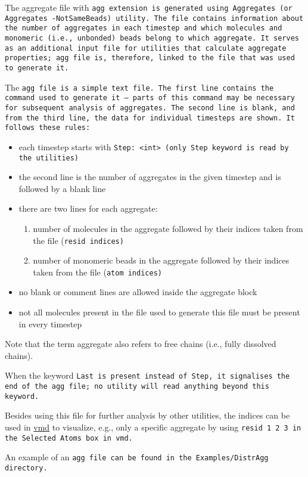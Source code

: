 The aggregate file with \tt{agg} extension is generated using
\tt{Aggregates} (or \tt{Aggregates -NotSameBeads}) utility. The
file contains information about the number of aggregates in each timestep
and which molecules and monomeric (i.e., unbonded) beads belong to which
aggregate. It serves as an additional input file for utilities that
calculate aggregate properties; \tt{agg} file is, therefore, linked to
the \vcf file that was used to generate it.

The \tt{agg} file is a simple text file. The first line contains the
command used to generate it -- parts of this command may be necessary for
subsequent analysis of aggregates. The second line is blank, and from the
third line, the data for individual timesteps are shown. It follows these
rules:

\begin{itemize}[topsep=0pt,itemsep=0pt]
  \item each timestep starts with \tt{Step: <int>} (only \tt{Step}
    keyword is read by the utilities)
  \item the second line is the number of aggregates in the given
    timestep and is followed by a blank line
  \item there are two lines for each aggregate:
  \begin{enumerate}[topsep=0pt,itemsep=0pt]
    \item number of molecules in the aggregate followed by their indices
      taken from the \vsf file (\tt{resid} indices)
    \item number of monomeric beads in the aggregate followed by their
      indices taken from the \vsf file (\tt{atom} indices)
  \end{enumerate}
  \item no blank or comment lines are allowed inside the aggregate block
  \item not all molecules present in the \vcf file used to generate
    this file must be present in every timestep
\end{itemize}

Note that the term aggregate also refers to free chains (i.e., fully
dissolved chains).

When the keyword \tt{Last} is present instead of \tt{Step}, it
signalises the end of the \tt{agg} file; no utility will read anything
beyond this keyword.

Besides using this file for further analysis by other utilities, the
indices can be used in \href{http://www.ks.uiuc.edu/Research/vmd/}{vmd} to
visualize, e.g., only a specific aggregate by using \tt{resid 1 2 3} in the
\tt{Selected Atoms} box in vmd.

An example of an \tt{agg} file can be found in the \tt{Examples/DistrAgg}
directory. %
